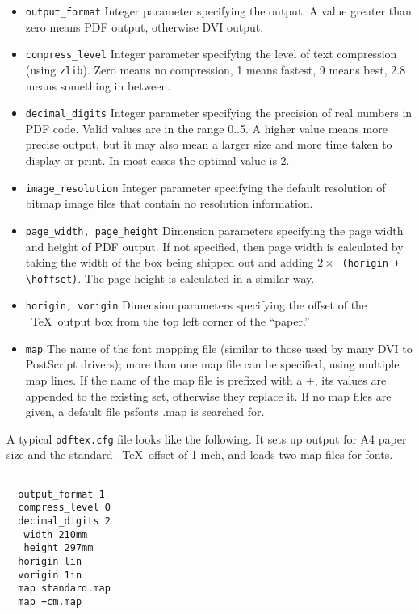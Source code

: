 \begin{itemize}
  \item \verb|output_format| Integer parameter specifying the output. A value greater than 
    zero means PDF output, otherwise DVI output. 
  \item \verb|compress_level| Integer parameter specifying the level of text compression (using 
    \verb|zlib|). Zero means no compression, 1 means fastest, 9 means best, 2.8 means 
    something in between. 
  \item \verb|decimal_digits| Integer parameter specifying the precision of real numbers in PDF 
    code. Valid values are in the range 0..5. A higher value means more precise 
    output, but it may also mean a larger size and more time taken to display or 
    print. In most cases the optimal value is 2. 

  \item \verb|image_resolution| Integer parameter specifying the default
    resolution of bitmap
    image files that contain no resolution information. 

  \item \verb|page_width, page_height| Dimension parameters specifying the page width and 
    height of PDF output. If not specified, then page width is calculated by 
    taking the width of the box being shipped out and adding $2\times\ $ \verb|(horigin + \hoffset)|. The page height is calculated in a similar way. 
  \item \verb|horigin, vorigin| Dimension parameters specifying the offset of the \ \TeX\  output 
    box from the top left corner of the ``paper.''
  \item \verb|map| The name of the font mapping file (similar to those used by many DVI to 
    PostScript drivers); more than one map file can be specified, using multiple map 
    lines. If the name of the map file is prefixed with a +, its values are appended 
    to the existing set, otherwise they replace it. If no map files are given, a default 
    file psfonts .map is searched for. 
\end{itemize}

A typical \verb|pdftex.cfg| file looks like the following. It sets up output for A4 paper 
size and the standard \ \TeX\  offset of 1 inch, and loads two map files for fonts. 

\begin{verbatim}
  
  output_format 1 
  compress_level O 
  decimal_digits 2 
  _width 210mm 
  _height 297mm 
  horigin lin 
  vorigin 1in 
  map standard.map 
  map +cm.map 

\end{verbatim}

